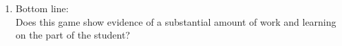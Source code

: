 \documentclass{article}
\begin{document}
\begin{enumerate}
\begin{multicols}{2}
\begin{enumerate}
\begin{itemize}
\item Not fun
\item Good mechanics for gameplay
\item Originality of game
\item Goals are well integrated and are appropriately rewarding
\item Feedback appropriately informs players
of what is important
\item Dynamic difficulty adjustment
\item Judge gets hooked on playing the game
\item Judge shouts, screams, or laughs out
loud while playing
\end{itemize}
\end{enumerate}
\end{multicols}
\item Bottom line:\\ Does this game show evidence of a substantial
  amount of work and learning on the part of the student?
\end{enumerate}
\end{document}
